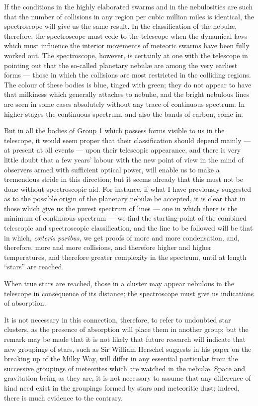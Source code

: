 \documentclass[a4paper, 12pt, oneside, polutonikogreek, english]{article}
\begin{document}
If the conditions in the highly elaborated swarms and in the nebulosities are such that the number of collisions in any region per cubic million miles is identical, the spectroscope will give us the same result. In the classification of the nebulæ, therefore, the spectroscope must cede to the telescope when the dynamical laws which must influence the interior movements of meteoric swarms have been fully worked out. The spectroscope, however, is certainly at one with the telescope in pointing out that the so-called planetary nebulæ are among the very earliest forms --- those in which the collisions are most restricted in the colliding regions. The colour of these bodies is blue, tinged with green; they do not appear to have that milkiness which generally attaches to nebulæ, and the bright nebulous lines are seen in some cases absolutely without any trace of continuous spectrum. In higher stages the continuous spectrum, and also the bands of carbon, come in.

But in all the bodies of Group 1 which possess forms visible to us in the telescope, it would seem proper that their classification should depend mainly --- at present at all events --- upon their telescopic appearance, and there is very little doubt that a few years' labour with the new point of view in the mind of observers armed with sufficient optical power, will enable us to make a tremendous stride in this direction; but it seems already that this must not be done without spectroscopic aid. For instance, if what I have previously suggested as to the possible origin of the planetary nebulæ be accepted, it is clear that in those which give us the purest spectrum of lines --- one in which there is the minimum of continuous spectrum --- we find the starting-point of the combined telescopic and spectroscopic classification, and the line to be followed will be that in which, \emph{cœteris paribus}, we get proofs of more and more condensation, and, therefore, more and more collisions, and therefore higher and higher temperatures, and therefore greater complexity in the spectrum, until at length ``stars'' are reached.

When true stars are reached, those in a cluster may appear nebulous in the telescope in consequence of its distance; the spectroscope must give us indications of absorption.

It is not necessary in this connection, therefore, to refer to undoubted star clusters, as the presence of absorption will place them in another group; but the remark may be made that it is not likely that future research will indicate that new groupings of stars, such as Sir William Herschel suggests in his paper on the breaking up of the Milky Way, will differ in any essential particular from the successive groupings of meteorites which are watched in the nebulæ. Space and gravitation being as they are, it is not necessary to assume that any difference of kind need exist in the groupings formed by stars and meteoritic dust; indeed, there is much evidence to the contrary.
\end{document}

